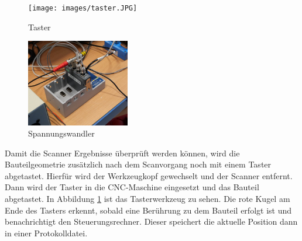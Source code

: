 \documentclass[../main.tex]{subfiles}
\begin{document}
\begin{figure}[b]
    \texttt{[image: images/taster.JPG]}
    \caption{Taster}
    \label{fig:taster}
\end{figure}

\begin{figure}[b]
    \includegraphics[width=0.4\textwidth]{images/piezoelektrische.JPG}
    \caption{Spannungswandler}
    \label{fig:piez}
\end{figure}

Damit die Scanner Ergebnisse überprüft werden können,
wird die Bauteilgeometrie zusätzlich nach dem Scanvorgang noch mit einem Taster
abgetastet. Hierfür wird der Werkzeugkopf gewechselt und der Scanner entfernt.
Dann wird der Taster in die CNC-Maschine eingesetzt und das Bauteil abgetastet.
In Abbildung \ref{fig:taster} ist das Tasterwerkzeug zu sehen. Die rote Kugel 
am Ende des Tasters erkennt, sobald eine Berührung zu dem Bauteil erfolgt ist 
und benachrichtigt den Steuerungsrechner. Dieser speichert die aktuelle Position 
dann in einer Protokolldatei.
\end{document}
